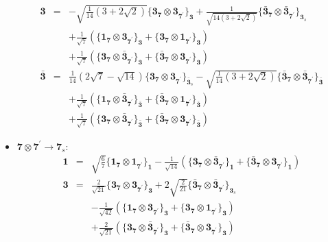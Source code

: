 \documentclass[english]{article}
\newcommand{\subcg}[3]{\big\{ {#1}\otimes{#2}\big\}^{}_{#3}}
\newcommand{\rep}[1]{\mathbf{#1}}
\begin{document}
\begin{itemize}
\begin{eqnarray*}
\rep{3} &=& -\sqrt{\frac{1}{14} \left(3+2 \sqrt{2}\right)}\subcg{\rep{3}_{\rep{7}}}{\rep{3}_{\rep{7^{\prime}}}}{\rep{3}}+\frac{1}{\sqrt{14 \left(3+2 \sqrt{2}\right)}}\subcg{\rep{\bar{3}}_{\rep{7}}}{\rep{\bar{3}}_{\rep{7^{\prime}}}}{\rep{3}_{s}} \\ 
 & & +\frac{1}{\sqrt{7}}\left(\subcg{\rep{1}_{\rep{7}}}{\rep{3}_{\rep{7^{\prime}}}}{\rep{3}}+\subcg{\rep{3}_{\rep{7}}}{\rep{1}_{\rep{7^{\prime}}}}{\rep{3}}\right) \\ 
 & & +\frac{1}{\sqrt{7}}\left(\subcg{\rep{3}_{\rep{7}}}{\rep{\bar{3}}_{\rep{7^{\prime}}}}{\rep{3}}+\subcg{\rep{\bar{3}}_{\rep{7}}}{\rep{3}_{\rep{7^{\prime}}}}{\rep{3}}\right)
\\
\rep{\bar{3}} &=& \frac{1}{14} \left(2 \sqrt{7}-\sqrt{14}\right)\subcg{\rep{3}_{\rep{7}}}{\rep{3}_{\rep{7^{\prime}}}}{\rep{\bar{3}}_{s}}-\sqrt{\frac{1}{14} \left(3+2 \sqrt{2}\right)}\subcg{\rep{\bar{3}}_{\rep{7}}}{\rep{\bar{3}}_{\rep{7^{\prime}}}}{\rep{\bar{3}}} \\ 
 & & +\frac{1}{\sqrt{7}}\left(\subcg{\rep{1}_{\rep{7}}}{\rep{\bar{3}}_{\rep{7^{\prime}}}}{\rep{\bar{3}}}+\subcg{\rep{\bar{3}}_{\rep{7}}}{\rep{1}_{\rep{7^{\prime}}}}{\rep{\bar{3}}}\right) \\ 
 & & +\frac{1}{\sqrt{7}}\left(\subcg{\rep{3}_{\rep{7}}}{\rep{\bar{3}}_{\rep{7^{\prime}}}}{\rep{\bar{3}}}+\subcg{\rep{\bar{3}}_{\rep{7}}}{\rep{3}_{\rep{7^{\prime}}}}{\rep{\bar{3}}}\right)
\end{eqnarray*}
\item $\rep{7}\otimes\rep{7^{\prime}}\to\rep{7}_{s}$:
\begin{eqnarray*}
\rep{1} &=& \sqrt{\frac{6}{7}}\subcg{\rep{1}_{\rep{7}}}{\rep{1}_{\rep{7^{\prime}}}}{\rep{1}}-\frac{1}{\sqrt{14}}\left(\subcg{\rep{3}_{\rep{7}}}{\rep{\bar{3}}_{\rep{7^{\prime}}}}{\rep{1}}+\subcg{\rep{\bar{3}}_{\rep{7}}}{\rep{3}_{\rep{7^{\prime}}}}{\rep{1}}\right)
\\
\rep{3} &=& \frac{2}{\sqrt{21}}\subcg{\rep{3}_{\rep{7}}}{\rep{3}_{\rep{7^{\prime}}}}{\rep{3}}+2 \sqrt{\frac{2}{21}}\subcg{\rep{\bar{3}}_{\rep{7}}}{\rep{\bar{3}}_{\rep{7^{\prime}}}}{\rep{3}_{s}} \\ 
 & & -\frac{1}{\sqrt{42}}\left(\subcg{\rep{1}_{\rep{7}}}{\rep{3}_{\rep{7^{\prime}}}}{\rep{3}}+\subcg{\rep{3}_{\rep{7}}}{\rep{1}_{\rep{7^{\prime}}}}{\rep{3}}\right) \\ 
 & & +\frac{2}{\sqrt{21}}\left(\subcg{\rep{3}_{\rep{7}}}{\rep{\bar{3}}_{\rep{7^{\prime}}}}{\rep{3}}+\subcg{\rep{\bar{3}}_{\rep{7}}}{\rep{3}_{\rep{7^{\prime}}}}{\rep{3}}\right)
\\

\end{eqnarray*}
\end{itemize}
\end{document}
